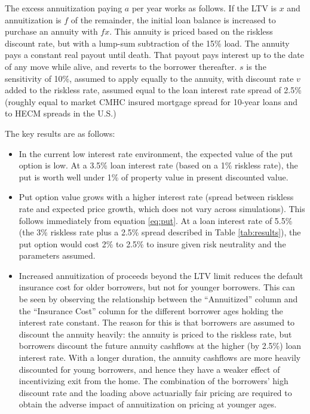 \documentclass[12pt]{article}
\begin{document}
The excess annuitization paying $a$ per year works as follows. If the LTV is $x$ and annuitization is $f$ of the remainder, the initial loan balance is increased to purchase an annuity with $fx$. This annuity is priced based on the riskless discount rate, but with a lump-sum subtraction of the 15\% load. The annuity pays a constant real payout until death. That payout pays interest up to the date of any move while alive, and reverts to the borrower thereafter. $s$ is the sensitivity of 10\%, assumed to apply equally to the annuity, with discount rate $v$ added to the riskless rate, assumed equal to the loan interest rate spread of 2.5\% (roughly equal to market CMHC insured mortgage spread for 10-year loans and to HECM spreads in the U.S.)

The key results are as follows:

\begin{itemize}
	\item In the current low interest rate environment, the expected value of the put option is low. At a 3.5\% loan interest rate (based on a 1\% riskless rate), the put is worth well under 1\% of property value in present discounted value.
	\item Put option value grows with a higher interest rate (spread between riskless rate and expected price growth, which does not vary across simulations). This follows immediately from equation \eqref{eq:put}. At a loan interest rate of 5.5\% (the 3\% riskless rate plus a 2.5\% spread described in Table \ref{tab:results}), the put option would cost 2\% to 2.5\% to insure given risk neutrality and the parameters assumed.
	\item Increased annuitization of proceeds beyond the LTV limit reduces the default insurance cost for older borrowers, but not for younger borrowers. This can be seen by observing the relationship between the ``Annuitized'' column and the ``Insurance Cost'' column for the different borrower ages holding the interest rate constant. The reason for this is that borrowers are assumed to discount the annuity heavily: the annuity is priced to the riskless rate, but borrowers discount the future annuity cashflows at the higher (by 2.5\%) loan interest rate. With a longer duration, the annuity cashflows are more heavily discounted for young borrowers, and hence they have a weaker effect of incentivizing exit from the home. The combination of the borrowers' high discount rate and the loading above actuarially fair pricing are required to obtain the adverse impact of annuitization on pricing at younger ages.
\end{itemize}
\end{document}
